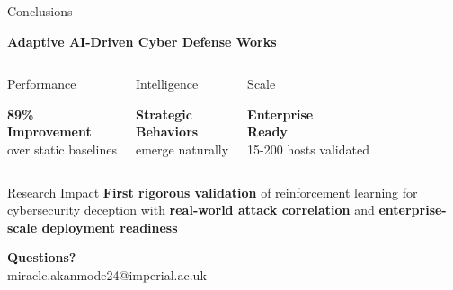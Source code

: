 \documentclass[aspectratio=169,xcolor=dvipsnames]{beamer}
\begin{document}
\begin{frame}{Conclusions}
\begin{center}
\Large\textbf{\textcolor{ImperialNavy}{Adaptive AI-Driven Cyber Defense Works}}
\end{center}

\begin{columns}[c]
\begin{block}{\textcolor{cwAlert}{Performance}}
\begin{center}
\textbf{\Huge 89\%}\\
\textbf{Improvement}\\
over static baselines
\end{center}
\end{block}

\begin{block}{\textcolor{cwFlow}{Intelligence}}
\begin{center}
\textbf{Strategic}\\
\textbf{Behaviors}\\
emerge naturally
\end{center}
\end{block}

\begin{block}{\textcolor{cwDecoy}{Scale}}
\begin{center}
\textbf{Enterprise}\\
\textbf{Ready}\\
15-200 hosts validated
\end{center}
\end{block}
\end{columns}

\vspace{0.5cm}

\begin{alertblock}{Research Impact}
\textbf{First rigorous validation} of reinforcement learning for cybersecurity deception with \textbf{real-world attack correlation} and \textbf{enterprise-scale deployment readiness}
\end{alertblock}

\vspace{0.3cm}
\begin{center}
\textcolor{ImperialBlue}{\textbf{Questions?}}\\
\textcolor{ImperialBlue}{miracle.akanmode24@imperial.ac.uk}
\end{center}
\end{frame}
\end{document}
